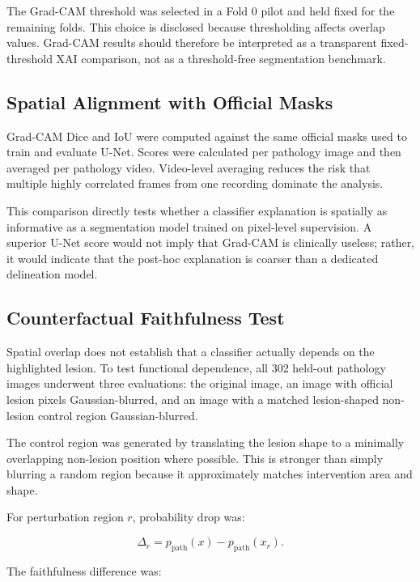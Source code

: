 The Grad-CAM threshold was selected in a Fold 0 pilot and held fixed for the remaining folds. This choice is disclosed because thresholding affects overlap values. Grad-CAM results should therefore be interpreted as a transparent fixed-threshold XAI comparison, not as a threshold-free segmentation benchmark.

\subsection{Spatial Alignment with Official Masks}

Grad-CAM Dice and IoU were computed against the same official masks used to train and evaluate U-Net. Scores were calculated per pathology image and then averaged per pathology video. Video-level averaging reduces the risk that multiple highly correlated frames from one recording dominate the analysis.

This comparison directly tests whether a classifier explanation is spatially as informative as a segmentation model trained on pixel-level supervision. A superior U-Net score would not imply that Grad-CAM is clinically useless; rather, it would indicate that the post-hoc explanation is coarser than a dedicated delineation model.

\subsection{Counterfactual Faithfulness Test}

Spatial overlap does not establish that a classifier actually depends on the highlighted lesion. To test functional dependence, all 302 held-out pathology images underwent three evaluations: the original image, an image with official lesion pixels Gaussian-blurred, and an image with a matched lesion-shaped non-lesion control region Gaussian-blurred.

The control region was generated by translating the lesion shape to a minimally overlapping non-lesion position where possible. This is stronger than simply blurring a random region because it approximately matches intervention area and shape.

For perturbation region $r$, probability drop was:

\begin{equation}
\Delta_r =
p_{\text{path}}(x)
-
p_{\text{path}}(x_r).
\end{equation}

The faithfulness difference was:

